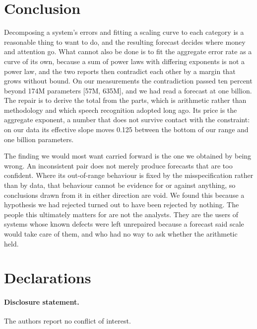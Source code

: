 \documentclass[11pt]{article}
\begin{document}
\section{Conclusion}
\label{sec:conclusion}

Decomposing a system's errors and fitting a scaling curve to each category is a
reasonable thing to want to do, and the resulting forecast decides where money and
attention go. What cannot also be done is to fit the aggregate error rate as a curve
of its own, because a sum of power laws with differing exponents is not a power law,
and the two reports then contradict each other by a margin that grows without bound.
On our measurements the contradiction passed ten percent beyond
174M parameters [57M, 635M],
and we had read a forecast at one billion. The repair is to derive the total from
the parts, which is arithmetic rather than methodology and which speech recognition
adopted long ago. Its price is the aggregate exponent, a number that does not
survive contact with the constraint: on our data its effective slope moves
0.125 between the bottom of our range and one billion parameters.

The finding we would most want carried forward is the one we obtained by being
wrong. An inconsistent pair does not merely produce forecasts that are too
confident. Where its out-of-range behaviour is fixed by the misspecification rather
than by data, that behaviour cannot be evidence for or against anything, so
conclusions drawn from it in either direction are void. We found this because a
hypothesis we had rejected turned out to have been rejected by nothing. The people this ultimately matters for are not the analysts.
They are the users of systems whose known defects were left unrepaired because a
forecast said scale would take care of them, and who had no way to ask whether the
arithmetic held.

\section*{Declarations}

\paragraph{Disclosure statement.}

The authors report no conflict of interest.
\end{document}
